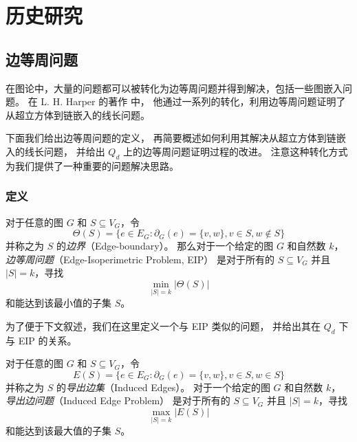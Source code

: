 
\chapter{历史研究}
\label{Chapter 3}

\section{边等周问题}
\label{Section 3.1}

在图论中，大量的问题都可以被转化为边等周问题并得到解决，包括一些图嵌入问题。
在 L. H. Harper 的著作 \cite{Harper.1964,Harper.2004} 中，
他通过一系列的转化，利用边等周问题证明了从超立方体到链嵌入的线长问题。

下面我们给出边等周问题的定义，
再简要概述如何利用其解决从超立方体到链嵌入的线长问题，
并给出 $Q_d$ 上的边等周问题证明过程的改进。
注意这种转化方式为我们提供了一种重要的问题解决思路。

\subsection{定义}
\label{Subsection 3.1.1}

对于任意的图 $G$ 和 $S \subseteq V_G$，令
\begin{equation}
\Theta(S) = \{e \in E_G \colon \partial_G(e) = \{v, w\}, v \in S, w \notin S\}
\end{equation}
并称之为 $S$ 的\emph{边界}（Edge-boundary）。
那么对于一个给定的图 $G$ 和自然数 $k$，
\emph{边等周问题}（Edge-Isoperimetric Problem, EIP）
是对于所有的 $S \subseteq V_G$ 并且 $|S| = k$，寻找
\begin{equation}
\min_{|S| = k} |\Theta(S)|
\end{equation}
和能达到该最小值的子集 $S$。

为了便于下文叙述，我们在这里定义一个与 EIP 类似的问题，
并给出其在 $Q_d$ 下与 EIP 的关系。

对于任意的图 $G$ 和 $S \subseteq V_G$，令
\begin{equation}
E(S) = \{e \in E_G \colon \partial_G(e) = \{v, w\}, v \in S, w \in S\}
\end{equation}
并称之为 $S$ 的\emph{导出边集}（Induced Edges）。
对于一个给定的图 $G$ 和自然数 $k$，
\emph{导出边问题}（Induced Edge Problem）
是对于所有的 $S \subseteq V_G$ 并且 $|S| = k$，寻找
\begin{equation}
\max_{|S| = k} |E(S)|
\end{equation}
和能达到该最大值的子集 $S$。

